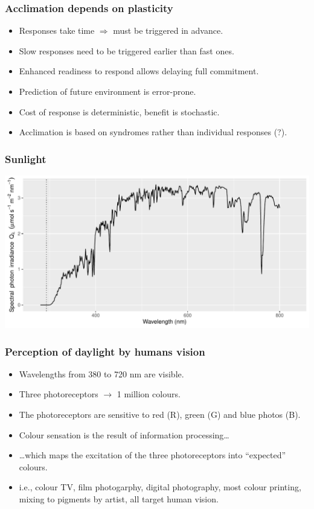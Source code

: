 \documentclass[11pt]{beamer}\usepackage[]{graphicx}\usepackage[]{xcolor}
\newenvironment{knitrout}{}{} %
\begin{document}
\begin{frame}
  \frametitle{Acclimation depends on plasticity}
\begin{itemize}
  \item Responses take time $\Rightarrow$ must be triggered in advance.
  \item Slow responses need to be triggered earlier than fast ones.
  \item Enhanced readiness to respond allows delaying full commitment.
  \item Prediction of future environment is error-prone.
  \item Cost of response is deterministic, benefit is stochastic.
  \item Acclimation is based on syndromes rather than individual responses (?).
\end{itemize}
\end{frame}

\begin{frame}
\frametitle{Sunlight}
\begin{knitrout}\scriptsize
{}\color{fgcolor}

{\centering \includegraphics[width=.95\textwidth]{figure/pos-plant-vision-00-1} 

}


\end{knitrout}
\end{frame}

\begin{frame}
\frametitle{Perception of daylight by humans vision}
\begin{itemize}
\item Wavelengths from 380 to 720 nm are visible.
\item Three photoreceptors $\rightarrow$ 1 million colours.
\item The photoreceptors are sensitive to red (R), green (G) and blue photos (B).
\item Colour sensation is the result of information processing\ldots
\item \ldots which maps the excitation of the three photoreceptors into ``expected'' colours.
\item i.e., colour TV, film photogarphy, digital photography, most colour printing, mixing to pigments by artist, all target human vision.
\end{itemize}
\end{frame}
\end{document}
